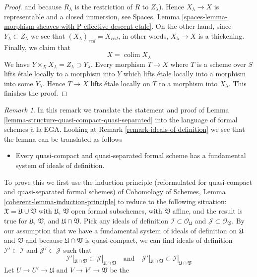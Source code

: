 \documentclass{stacks-project}
\theoremstyle{plain}
\theoremstyle{definition}
\theoremstyle{remark}
\newtheorem{remark}[subsection]{Remark}
\numberwithin{equation}{subsection}
\def\colim{\mathop{\mathrm{colim}}\nolimits}
\begin{document}
\begin{proof}
and because $R_\lambda$ is the restriction of $R$ to $Z_\lambda$).
Hence $X_\lambda \to X$ is representable and a closed immersion, see
Spaces, Lemma
\ref{spaces-lemma-morphism-sheaves-with-P-effective-descent-etale}.
On the other hand, since $Y_\lambda \subset Z_\lambda$ we see that
$(X_\lambda)_{red} = X_{red}$, in other words, $X_\lambda \to X$
is a thickening. Finally, we claim that
$$
X = \colim X_\lambda
$$
We have $Y \times_X X_\lambda = Z_\lambda \supset Y_\lambda$. Every
morphism $T \to X$ where $T$ is a scheme over $S$ lifts \'etale locally
to a morphism into $Y$ which lifts \'etale locally into a morphism
into some $Y_\lambda$. Hence $T \to X$ lifts \'etale locally on
$T$ to a morphism into $X_\lambda$. This finishes the proof.
\end{proof}

\begin{remark}
\label{remark-structure-quasi-compact-quasi-separated}
In this remark we translate the statement and proof of
Lemma \ref{lemma-structure-quasi-compact-quasi-separated}
into the language of formal schemes \`a la EGA.
Looking at Remark \ref{remark-ideals-of-definition} we see
that the lemma can be translated as follows
\begin{itemize}
\item[(*)] Every quasi-compact and quasi-separated formal
scheme has a fundamental system of ideals of definition.
\end{itemize}
To prove this we first use the induction principle (reformulated for
quasi-compact and quasi-separated formal schemes) of
Cohomology of Schemes, Lemma \ref{coherent-lemma-induction-principle}
to reduce to the following situation:
$\mathfrak X = \mathfrak U \cup \mathfrak V$
with $\mathfrak U$, $\mathfrak V$ open formal subschemes,
with $\mathfrak V$ affine, and the result is true for $\mathfrak U$,
$\mathfrak V$, and $\mathfrak U \cap \mathfrak V$. Pick any ideals
of definition $\mathcal{I} \subset \mathcal{O}_\mathfrak U$
and $\mathcal{J} \subset \mathcal{O}_\mathfrak V$.
By our assumption that we have a fundamental system of ideals
of definition on $\mathfrak U$ and $\mathfrak V$ and because
$\mathfrak U \cap \mathfrak V$ is quasi-compact, we can find
ideals of definition $\mathcal{I}' \subset \mathcal{I}$
and $\mathcal{J}' \subset \mathcal{J}$
such that
$$
\mathcal{I}'|_{\mathfrak U \cap \mathfrak V} \subset
\mathcal{J}|_{\mathfrak U \cap \mathfrak V}
\quad\text{and}\quad
\mathcal{J}'|_{\mathfrak U \cap \mathfrak V} \subset
\mathcal{I}|_{\mathfrak U \cap \mathfrak V}
$$
Let $U \to U' \to \mathfrak U$ and $V \to V' \to \mathfrak V$ be the

\end{remark}
\end{document}
